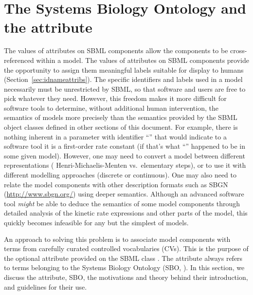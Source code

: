 
\section{The Systems Biology Ontology and the  attribute}
\label{sec:sboTerm}
\label{sec:sbo}

The values of  attributes on SBML components allow the
components to be cross-referenced within a model. The values of
 attributes on SBML components provide the opportunity
to assign them meaningful labels suitable for display to humans
(Section~\ref{sec:idnameattribs}).  The specific identifiers and
labels used in a model necessarily must be unrestricted by SBML,
so that software and users are free to pick whatever they need.
However, this freedom makes it more difficult for software tools
to determine, without additional human intervention, the semantics
of models more precisely than the semantics provided by the SBML
object classes defined in other sections of this document.  For
example, there is nothing inherent in a parameter with identifier
``'' that would indicate to a software tool it is a
first-order rate constant (if that's what ``'' happened
to be in some given model).  However, one may need to convert a
model between different representations (\eg
Henri-Michaelis-Menten vs.\ elementary steps), or to use it with
different modelling approaches (discrete or continuous).  One may
also need to relate the model components with other description
formats such as SBGN (\url{http://www.sbgn.org/}) using deeper
semantics.  Although an advanced software tool \emph{might} be
able to deduce the semantics of some model components through
detailed analysis of the kinetic rate expressions and other parts
of the model, this quickly becomes infeasible for any but the
simplest of models.

An approach to solving this problem is to associate model
components with terms from carefully curated controlled
vocabularies (CVs).  This is the purpose of the optional
 attribute provided on the SBML
class \SBase.  The  attribute always refers to
terms belonging to the Systems Biology Ontology (SBO, \sboref). In
this section, we discuss the  attribute,
SBO, the motivations and theory behind their introduction, and
guidelines for their use.

